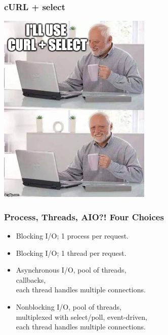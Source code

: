 \begin{frame}
	\frametitle{cURL + select}
	\begin{center}
		\includegraphics[width=0.55\textwidth]{images/harold.jpg}
	\end{center}


\end{frame}

\begin{frame}
  \frametitle{Process, Threads, AIO?! Four Choices}

  
    \begin{itemize}
      \item Blocking I/O; 1 process per request.
      \item Blocking I/O; 1 thread per request.
      \item Asynchronous I/O, pool of threads, \\callbacks, \\ each thread handles multiple connections.
      \item Nonblocking I/O, pool of threads, \\ multiplexed with select/poll,
        event-driven, \\ each thread handles multiple connections.
    \end{itemize}
  

\end{frame}

